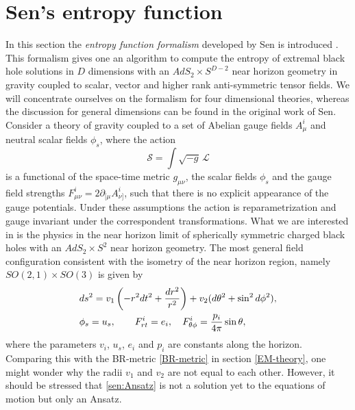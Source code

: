 \documentclass[12pt,twoside]{book}
\begin{document}
\section{Sen's entropy function}
\label{sec:senEntropyFunc}

In this section the \emph{entropy function formalism} developed by Sen is introduced \cite{Sen:2005kx,Sen:2007fk}. This formalism gives one an algorithm to compute the entropy of extremal black hole solutions in $D$ dimensions with an $AdS_{2} \times S^{D-2}$ near horizon geometry in gravity coupled to scalar, vector and higher rank anti-symmetric tensor fields. We will concentrate ourselves on the formalism for four dimensional theories, whereas the discussion for general dimensions can be found in the original work of Sen.\\

Consider a theory of gravity coupled to a set of Abelian gauge fields $A^{i}_{\mu}$ and neutral scalar fields $\phi_{s}$, where the action
\begin{equation}\label{eq:actionOrigSen}
\mathcal{S}= \int \sqrt{-g} \, \mathcal{L}
\end{equation}
is a functional of the space-time metric $g_{\mu\nu}$, the scalar fields $\phi_{s}$ and the gauge field strengths $F^{i}_{\mu\nu}=2\partial_{[\mu} A^{i}_{\nu ]}$, such that there is no explicit appearance of the gauge potentials. Under these assumptions the action is reparametrization and gauge invariant under the correspondent transformations.
What we are interested in is the physics in the near horizon limit of spherically symmetric charged black holes with an $AdS_{2} \times S^{2}$ near horizon geometry. The most general field configuration consistent with the isometry of the near horizon region, namely $SO(2,1) \times SO(3)$ is given by \cite{Sen:2007fk}
\begin{align}\label{sen:Ansatz}
&ds^{2} = v_{1} \left( -r^{2}dt^{2} + \frac{dr^{2}}{r^{2}} \right) + v_{2} (d\theta^{2}+\sin^{2}d\phi^{2}), \notag\\
&\phi_{s} = u_{s},\qquad
F^{i}_{rt} = e_{i}, \quad F^{i}_{\theta\phi} = \frac{p_{i}}{4\pi} \sin\theta,
\end{align}
where the parameters $v_{i}$, $u_{s}$, $e_{i}$ and $p_{i}$ are constants along the horizon. 
Comparing this with the BR-metric \eqref{BR-metric} in section \ref{EM-theory}, one might wonder why the radii $v_{1}$ and $v_{2}$ are not equal to each other. However, it should be stressed that \eqref{sen:Ansatz} is not a solution yet to the equations of motion but only an Ansatz.
\end{document}
